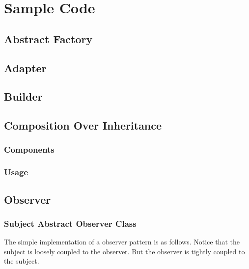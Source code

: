\section{Sample Code}

\subsection{Abstract Factory}
\label{code:abstract-factory}

\subsection{Adapter}
\label{code:adapter}

\subsection{Builder}
\label{code:builder}

\subsection{Composition Over Inheritance}
\subsubsection{Components}
\label{code:coi-component}
\subsubsection{Usage}
\label{code:coi-usage}

\subsection{Observer}\label{code:observer}
\subsubsection{Subject Abstract Observer Class}
The simple implementation of a observer pattern is as follows. Notice that the subject is loosely coupled to the observer. But the observer is tightly coupled to the subject.

